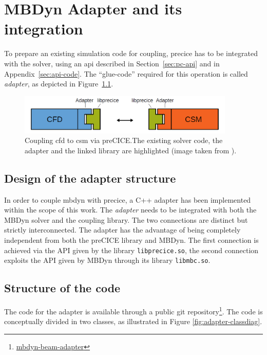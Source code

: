 \chapter{MBDyn Adapter and its integration}
\label{cha:adapter}


To prepare an existing simulation code for coupling, \acrshort{precice} has to be integrated with the solver, using  an \acrshort{api} described in Section~\ref{sec:pc-api} and in Appendix~\ref{sec:api-code}. The ``glue-code'' required for this operation is called \textit{adapter}, as depicted in Figure~\ref{fig:adapter-scheme}.


\begin{figure}[htbp!]
	\centering
	\includegraphics[width=0.92\textwidth]{images/adapter_scheme}
	\caption{Coupling \acrshort{cfd} to \acrshort{csm} via preCICE.The existing solver code, the adapter and the linked library are highlighted (image taken from \cite{uekermann2017official}).}
	\label{fig:adapter-scheme}
\end{figure}


\section{Design of the adapter structure}


In order to couple \acrshort{mbdyn} with \acrshort{precice}, a C++ adapter has been implemented within the scope of this work. The \textit{adapter} needs to be integrated with both the MBDyn solver and the coupling library. The two connections are distinct but strictly interconnected.
The adapter has the advantage of being completely independent from both the preCICE library and MBDyn. The first connection is achieved via the API given by the library \texttt{libprecice.so}, the second connection exploits the API given by MBDyn through its library \texttt{libmbc.so}.


\section{Structure of the code}

The code for the adapter is available through a public git repository\footnote{\href{https://gitlab.com/Ccaccia73/mbdyn-adapter-test/-/tree/develop}{mbdyn-beam-adapter}}. The code is conceptually divided in two classes, as illustrated in Figure \ref{fig:adapter-classdiag}.

